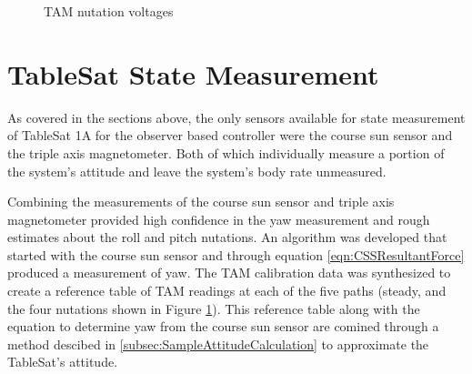 \begin{figure}[H]
  \centerline{}
  \caption{TAM nutation voltages}
  \label{fig:TAMNutationVoltages}
\end{figure}

\section{TableSat State Measurement}
\label{subsec:StateMeasurement}

As covered in the sections above, the only sensors available for state measurement of TableSat 1A for the observer based controller were the course sun sensor and the triple axis magnetometer.  Both of which individually measure a portion of the system's attitude and leave the system's body rate unmeasured.

Combining the measurements of the course sun sensor and triple axis magnetometer provided high confidence in the yaw measurement and rough estimates about the roll and pitch nutations.  An algorithm was developed that started with the course sun sensor and through equation \ref{eqn:CSSResultantForce} produced a measurement of yaw.  The TAM calibration data was synthesized to create a reference table of TAM readings at each of the five paths (steady, and the four nutations shown in Figure \ref{fig:TAMNutationVoltages}).  This reference table along with the equation to determine yaw from the course sun sensor are comined through a method descibed in \ref{subsec:SampleAttitudeCalculation} to approximate the TableSat's attitude.

